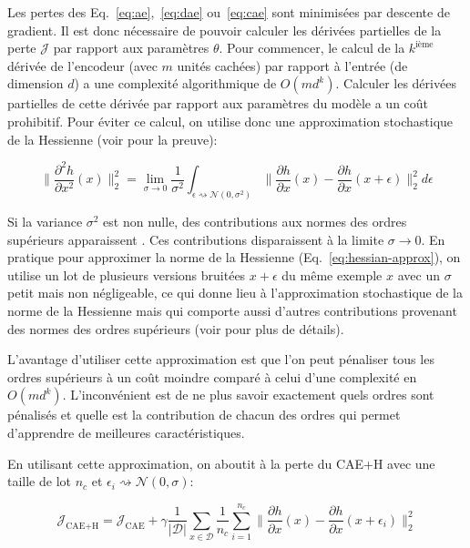 Les pertes des Eq.~\ref{eq:ae},~\ref{eq:dae} ou~\ref{eq:cae} sont minimisées par
descente de gradient. Il est donc nécessaire de pouvoir calculer les dérivées
partielles de la perte $\mathcal{J}$ par rapport aux paramètres $\theta$. Pour commencer, le calcul de
la $k^{\textrm{ième}}$ dérivée de l'encodeur (avec $m$ unités cachées) par
rapport à l'entrée (de dimension $d$) a une complexité algorithmique de
$O(md^k)$.  Calculer les dérivées partielles de cette dérivée par rapport aux
paramètres du modèle a un coût prohibitif. Pour éviter ce calcul, on utilise donc
une approximation stochastique de la Hessienne (voir \cite{Salah+al-2011} pour
la preuve):

\begin{equation}
\|\dfrac{\partial^2 h}{\partial x^2}(x) \|_2^2 = \lim_{\sigma\rightarrow 0}\frac{1}{\sigma^2}\int_{\epsilon \rightsquigarrow \mathcal{N}(0,\sigma^2)} \| \dfrac{\partial h}{\partial x}(x) - \dfrac{\partial h}{\partial x}(x+\epsilon) \|^2_2 d\epsilon
\label{eq:hessian-approx}
\end{equation}

Si la variance $\sigma^{2}$ est non nulle, des contributions aux normes des ordres
supérieurs apparaissent \citep{Salah+al-2011}. Ces contributions disparaissent à
la limite $\sigma\rightarrow 0$. En pratique pour approximer la norme de la
Hessienne (Eq.~\ref{eq:hessian-approx}), on utilise un lot de plusieurs
versions bruitées $x+\epsilon$ du m\^eme exemple $x$ avec un $\sigma$ petit
mais non négligeable, ce qui donne lieu à l'approximation stochastique de la
norme de la Hessienne mais qui comporte aussi d'autres contributions provenant des
normes des ordres supérieurs (voir \cite{Salah+al-2011} pour plus de détails).

L'avantage d'utiliser cette approximation est que l'on peut pénaliser tous les
ordres supérieurs à un coût moindre comparé à celui d'une complexité en $O(md^k)$.
L'inconvénient est de ne plus savoir exactement quels ordres sont pénalisés et
quelle est la contribution de chacun des ordres qui permet d'apprendre de
meilleures caractéristiques. 

En utilisant cette approximation,  on aboutit à la perte du CAE+H avec
une taille de lot $n_c$ et $\epsilon_i \rightsquigarrow \mathcal{N}(0,\sigma)$:

\begin{equation}
\mathcal{J}_\textrm{CAE+H} = \mathcal{J}_\textrm{CAE} + \gamma\frac{1}{\vert \mathcal{D}\vert}\sum_{x\in\mathcal{D}} \frac{1}{n_c}\sum^{n_c}_{i=1} \| \dfrac{\partial h}{\partial x}(x) - \dfrac{\partial h}{\partial x}(x+\epsilon_i) \|^2_2 
\label{eq:cae}
\end{equation}

